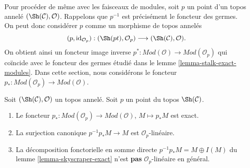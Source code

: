 \noindent
Pour procéder de même avec les faisceaux de modules, soit $p$ un point d'un
topos annelé $(\Sh(\mathcal{C}), \mathcal{O})$. Rappelons que $p^{-1}$ est
précisément le foncteur des germes. On peut donc considérer $p$ comme un morphisme
de topos annelés
$$
(p, \text{id}_{\mathcal{O}_p}) :
(\Sh(pt), \mathcal{O}_p)
\longrightarrow
(\Sh(\mathcal{C}), \mathcal{O}).
$$
On obtient ainsi un foncteur image inverse
$p^* : \textit{Mod}(\mathcal{O}) \to \textit{Mod}(\mathcal{O}_p)$
qui coïncide avec le foncteur des germes étudié dans le
lemme \ref{lemma-stalk-exact-modules}. Dans cette section, nous considérons le foncteur
$p_* : \textit{Mod}(\mathcal{O}_p) \to \textit{Mod}(\mathcal{O})$.

\begin{lemma}
\label{lemma-skyscraper-modules-exact}
Soit $(\Sh(\mathcal{C}), \mathcal{O})$ un topos annelé.
Soit $p$ un point du topos $\Sh(\mathcal{C})$.
\begin{enumerate}
\item Le foncteur
$p_* : \textit{Mod}(\mathcal{O}_p) \to \textit{Mod}(\mathcal{O})$,
$M \mapsto p_*M$ est exact.
\item La surjection canonique $p^{-1}p_*M \to M$ est $\mathcal{O}_p$-linéaire.
\item La décomposition fonctorielle en somme directe
$p^{-1}p_*M = M \oplus I(M)$ du lemme \ref{lemma-skyscraper-exact}
n'est {\bf pas} $\mathcal{O}_p$-linéaire en général.
\end{enumerate}
\end{lemma}

